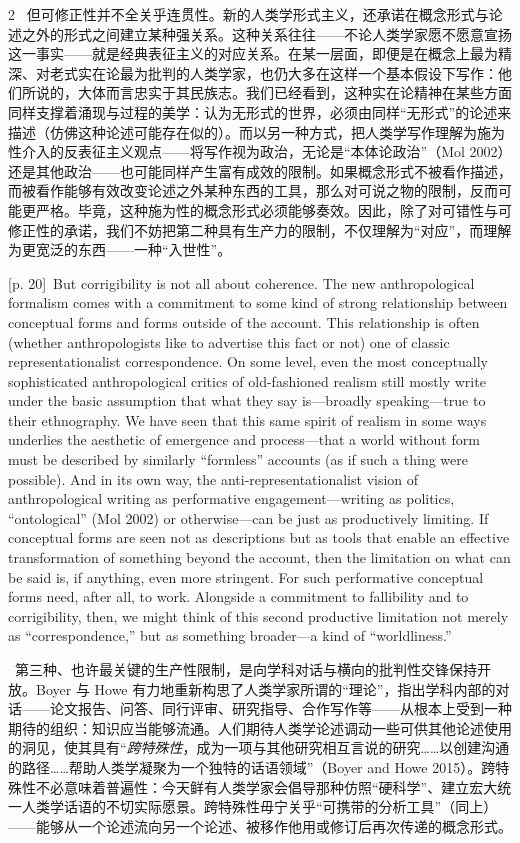 \documentclass[10pt,a4paper]{article}
\begin{document}
\begin{paracol}{2}
\switchcolumn*
{\scriptsize\color{gray} [p. 20]}\ 但可修正性并不全关乎连贯性。新的人类学形式主义，还承诺在概念形式与论述之外的形式之间建立某种强关系。这种关系往往——不论人类学家愿不愿意宣扬这一事实——就是经典表征主义的对应关系。在某一层面，即便是在概念上最为精深、对老式实在论最为批判的人类学家，也仍大多在这样一个基本假设下写作：他们所说的，大体而言忠实于其民族志。我们已经看到，这种实在论精神在某些方面同样支撑着涌现与过程的美学：认为无形式的世界，必须由同样“无形式”的论述来描述（仿佛这种论述可能存在似的）。而以另一种方式，把人类学写作理解为施为性介入的反表征主义观点——将写作视为政治，无论是“本体论政治”（Mol 2002）还是其他政治——也可能同样产生富有成效的限制。如果概念形式不被看作描述，而被看作能够有效改变论述之外某种东西的工具，那么对可说之物的限制，反而可能更严格。毕竟，这种施为性的概念形式必须能够奏效。因此，除了对可错性与可修正性的承诺，我们不妨把第二种具有生产力的限制，不仅理解为“对应”，而理解为更宽泛的东西——一种“入世性”。\par
\switchcolumn
{\scriptsize\color{gray} [p. 20]}\ But corrigibility is not all about coherence. The new anthropological formalism comes with a commitment to some kind of strong relationship between conceptual forms and forms outside of the account. This relationship is often (whether anthropologists like to advertise this fact or not) one of classic representationalist correspondence. On some level, even the most conceptually sophisticated anthropological critics of old-fashioned realism still mostly write under the basic assumption that what they say is—broadly speaking—true to their ethnography. We have seen that this same spirit of realism in some ways underlies the aesthetic of emergence and process—that a world without form must be described by similarly “formless” accounts (as if such a thing were possible). And in its own way, the anti-representationalist vision of anthropological writing as performative engagement—writing as politics, “ontological” (Mol 2002) or otherwise—can be just as productively limiting. If conceptual forms are seen not as descriptions but as tools that enable an effective transformation of something beyond the account, then the limitation on what can be said is, if anything, even more stringent. For such performative conceptual forms need, after all, to work. Alongside a commitment to fallibility and to corrigibility, then, we might think of this second productive limitation not merely as “correspondence,” but as something broader—a kind of “worldliness.”\par
\switchcolumn*
{\scriptsize\color{gray} [p. 21]}\ 第三种、也许最关键的生产性限制，是向学科对话与横向的批判性交锋保持开放。Boyer 与 Howe 有力地重新构思了人类学家所谓的“理论”，指出学科内部的对话——论文报告、问答、同行评审、研究指导、合作写作等——从根本上受到一种期待的组织：知识应当能够流通。人们期待人类学论述调动一些可供其他论述使用的洞见，使其具有“\textit{跨特殊性}，成为一项与其他研究相互言说的研究……以创建沟通的路径……帮助人类学凝聚为一个独特的话语领域”（Boyer and Howe 2015）。跨特殊性不必意味着普遍性：今天鲜有人类学家会倡导那种仿照“硬科学”、建立宏大统一人类学话语的不切实际愿景。跨特殊性毋宁关乎“可携带的分析工具”（同上）——能够从一个论述流向另一个论述、被移作他用或修订后再次传递的概念形式。\par

\end{paracol}
\end{document}
